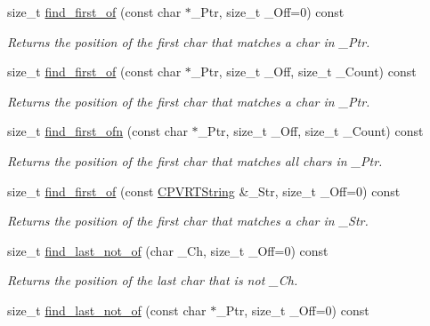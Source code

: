 \begin{DoxyCompactItemize}
size\+\_\+t \hyperlink{class_c_p_v_r_t_string_acf7a7dba5c5a24d21c82f48f8e43aa2c}{find\+\_\+first\+\_\+of} (const char $\ast$\+\_\+\+Ptr, size\+\_\+t \+\_\+\+Off=0) const 
\begin{DoxyCompactList}\small\item\em Returns the position of the first char that matches a char in \+\_\+\+Ptr. \end{DoxyCompactList}\item 
size\+\_\+t \hyperlink{class_c_p_v_r_t_string_aae271ed8924554b0bf14e500633b7946}{find\+\_\+first\+\_\+of} (const char $\ast$\+\_\+\+Ptr, size\+\_\+t \+\_\+\+Off, size\+\_\+t \+\_\+\+Count) const 
\begin{DoxyCompactList}\small\item\em Returns the position of the first char that matches a char in \+\_\+\+Ptr. \end{DoxyCompactList}\item 
size\+\_\+t \hyperlink{class_c_p_v_r_t_string_a2fd28a7d1cc030927ed08a11bc3cda2f}{find\+\_\+first\+\_\+ofn} (const char $\ast$\+\_\+\+Ptr, size\+\_\+t \+\_\+\+Off, size\+\_\+t \+\_\+\+Count) const 
\begin{DoxyCompactList}\small\item\em Returns the position of the first char that matches all chars in \+\_\+\+Ptr. \end{DoxyCompactList}\item 
size\+\_\+t \hyperlink{class_c_p_v_r_t_string_a5d98a7e0630190435a8a76f798d915d4}{find\+\_\+first\+\_\+of} (const \hyperlink{class_c_p_v_r_t_string}{C\+P\+V\+R\+T\+String} \&\+\_\+\+Str, size\+\_\+t \+\_\+\+Off=0) const 
\begin{DoxyCompactList}\small\item\em Returns the position of the first char that matches a char in \+\_\+\+Str. \end{DoxyCompactList}\item 
size\+\_\+t \hyperlink{class_c_p_v_r_t_string_aa92b066c4e466add4803bcc6a7ce9833}{find\+\_\+last\+\_\+not\+\_\+of} (char \+\_\+\+Ch, size\+\_\+t \+\_\+\+Off=0) const 
\begin{DoxyCompactList}\small\item\em Returns the position of the last char that is not \+\_\+\+Ch. \end{DoxyCompactList}\item 
size\+\_\+t \hyperlink{class_c_p_v_r_t_string_a6e321f49478b32a043500f89e6dc5131}{find\+\_\+last\+\_\+not\+\_\+of} (const char $\ast$\+\_\+\+Ptr, size\+\_\+t \+\_\+\+Off=0) const 

\end{DoxyCompactItemize}
